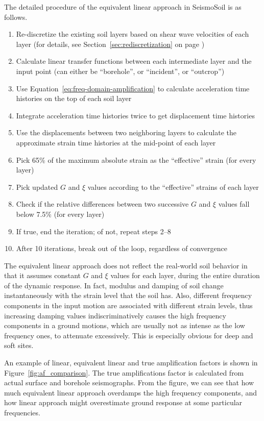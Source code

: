 \documentclass[11pt,letterpaper]{article}
\begin{document}
The detailed procedure of the equivalent linear approach in SeismoSoil is as follows.
\begin{enumerate}
    \item Re-discretize the existing soil layers based on shear wave velocities of each layer (for details, see Section~\ref{sec:rediscretization} on page \pageref{sec:rediscretization})
    \item Calculate linear transfer functions between each intermediate layer and the input point (can either be ``borehole'', or ``incident'', or ``outcrop'')
    \item Use Equation~\eqref{eq:freq-domain-amplification} to calculate acceleration time histories on the top of each soil layer
    \item Integrate acceleration time histories twice to get displacement time histories
    \item Use the displacements between two neighboring layers to calculate the approximate strain time histories at the mid-point of each layer
    \item Pick 65\% of the maximum absolute strain as the ``effective'' strain (for every layer)
    \item Pick updated $G$ and $\xi$ values according to the ``effective'' strains of each layer
    \item Check if the relative differences between two successive $G$ and $\xi$ values fall below 7.5\% (for every layer)
    \item If true, end the iteration; of not, repeat steps 2--8
    \item After 10 iterations, break out of the loop, regardless of convergence
\end{enumerate}

The equivalent linear approach does not reflect the real-world soil behavior in that it assumes constant $G$ and $\xi$ values for each layer, during the entire duration of the dynamic response. In fact, modulus and damping of soil change instantaneously with the strain level that the soil has. Also, different frequency components in the input motion are associated with different strain levels, thus increasing damping values indiscriminatively causes the high frequency components in a ground motions, which are usually not as intense as the low frequency ones, to attenuate excessively. This is especially obvious for deep and soft sites.

An example of linear, equivalent linear and true amplification factors is shown in Figure~\ref{fig:af_comparison}. The true amplifications factor is calculated from actual surface and borehole seismographs. From the figure, we can see that how much equivalent linear approach overdamps the high frequency components, and how linear approach might overestimate ground response at some particular frequencies.
\end{document}
